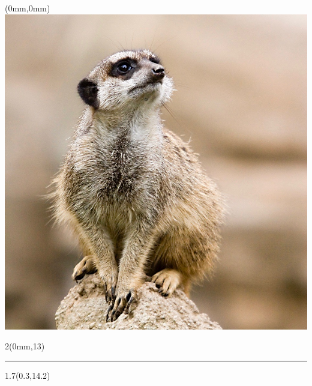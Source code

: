 \begin{textblock*}{8.5in}(0mm,0mm)
  \includegraphics[height=\imageheight,keepaspectratio=true]{Suricata.jpg}
\end{textblock*}

\begin{textblock*}{2\TPHorizModule}(0mm,13\TPVertModule)
  \textcolor{white}{\rule{\linewidth}{8\TPVertModule}}
\end{textblock*}

\begin{textblock*}{1.7\TPHorizModule}(0.3\TPHorizModule,14.2\TPVertModule)
  \thetitle
\end{textblock*}

\endgroup

